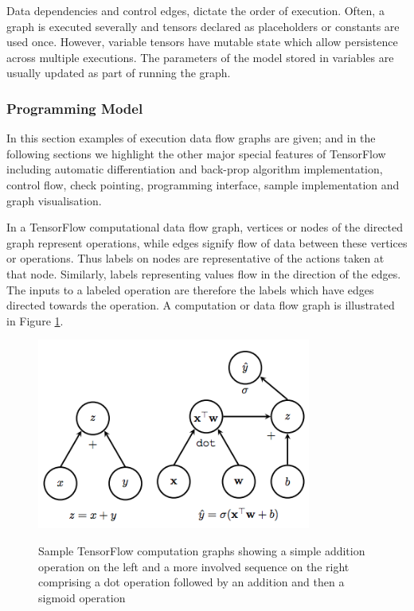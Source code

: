 Data dependencies and control edges, dictate the order of execution. Often, a graph is executed severally and tensors declared as placeholders or constants are used once. However, variable tensors have mutable state which allow persistence across multiple executions. The parameters of the model stored in variables are usually updated as part of running the graph.

\subsubsection{Programming Model}
In this section examples of execution data flow graphs are given; and in the following sections we highlight the other major special features of TensorFlow including automatic differentiation and back-prop algorithm implementation, control flow, check pointing, programming interface, sample implementation and graph visualisation.

In a TensorFlow computational data flow graph, vertices or nodes of the directed graph represent operations, while edges signify flow of data between these vertices or operations. Thus labels on nodes are representative of the actions taken at that node.  Similarly, labels representing values flow in the direction of the edges. The inputs to a labeled operation are therefore the labels which have edges directed towards the operation. A computation or data flow graph is illustrated in Figure \ref{fig_c3_tfg}. 
\begin{figure}
\centering
  \includegraphics[width=9cm]{thesis/images/tfgraph}\\
  \caption{Sample TensorFlow computation graphs\citep{goldsborough2016tour} showing a simple addition operation on the left and a more involved sequence on the right comprising a dot operation followed by an addition and then a sigmoid operation}\label{fig_c3_tfg}
\end{figure}

